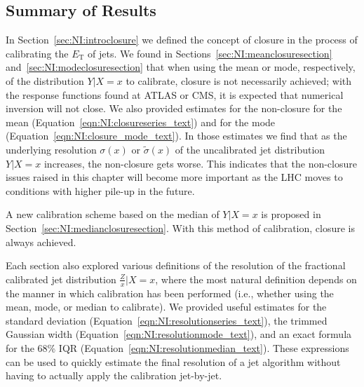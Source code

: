 \subsection{Summary of Results}
\label{sec:NI:summary}
In Section~\ref{sec:NI:introclosure} we defined the concept of closure in the process of calibrating the $E_\text{T}$ of jets.  We found in Sections~\ref{sec:NI:meanclosuresection} and~\ref{sec:NI:modeclosuresection} that when using the mean or mode, respectively, of the distribution $Y|X=x$ to calibrate, closure is not necessarily achieved; with the response functions found at ATLAS or CMS, it is expected that numerical inversion will not close. We also provided estimates for the non-closure for the mean (Equation~\ref{eqn:NI:closureseries_text}) and for the mode (Equation~\ref{eqn:NI:closure_mode_text}). In those estimates we find that as the underlying resolution $\sigma(x)$ or $\tilde{\sigma}(x)$ of the uncalibrated jet distribution $Y|X=x$ increases, the non-closure gets worse. This indicates that the non-closure issues raised in this chapter will become more important as the LHC moves to conditions with higher pile-up in the future.

\vspace{2mm}

A new calibration scheme based on the median of $Y|X=x$ is proposed in Section~\ref{sec:NI:medianclosuresection}.  With this method of calibration, closure is always achieved.

\vspace{2mm}

Each section also explored various definitions of the resolution of the fractional calibrated jet distribution $\frac{Z}{x}|X=x$, where the most natural definition depends on the manner in which calibration has been performed (i.e., whether using the mean, mode, or median to calibrate). We provided useful estimates for the standard deviation (Equation~\ref{eqn:NI:resolutionseries_text}), the trimmed Gaussian width (Equation~\ref{eqn:NI:resolutionmode_text}), and an exact formula for the 68\% IQR (Equation~\ref{eqn:NI:resolutionmedian_text}). These expressions can be used to quickly estimate the final resolution of a jet algorithm without having to actually apply the calibration jet-by-jet.

